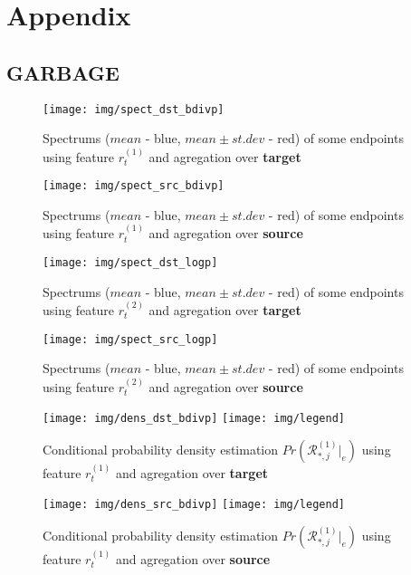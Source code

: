 \appendix
{}
\thispagestyle{empty}  
\renewcommand{\appendixname}{Appendix}%


\chapter*{Appendix}

\section*{GARBAGE}

\begin{figure}[h!]%
  \centering
  \texttt{[image: img/spect\_dst\_bdivp]}
  \caption{Spectrums ($mean$ - blue, $mean\pm st.dev$ - red) of some  endpoints using feature $r_t^{(1)}$ and agregation over \textbf{target}}
  \label{fig:spect_dst_bdivp}
\end{figure}
\begin{figure}[h!]%
  \centering
  \texttt{[image: img/spect\_src\_bdivp]}
  \caption{Spectrums ($mean$ - blue, $mean\pm st.dev$ - red) of some  endpoints using feature $r_t^{(1)}$ and agregation over \textbf{source}}
  \label{fig:spect_src_bdivp}
\end{figure}
\begin{figure}[h!]%
  \centering
  \texttt{[image: img/spect\_dst\_logp]}
  \caption{Spectrums ($mean$ - blue, $mean\pm st.dev$ - red) of some  endpoints using feature $r_t^{(2)}$ and agregation over \textbf{target}}
  \label{fig:spect_dst_logp}
\end{figure}
\begin{figure}[h!]%
  \centering
  \texttt{[image: img/spect\_src\_logp]}
  \caption{Spectrums ($mean$ - blue, $mean\pm st.dev$ - red) of some  endpoints using feature $r_t^{(2)}$ and agregation over \textbf{source}}
  \label{fig:spect_src_logp}
\end{figure}
\begin{figure}[h!]%
  \centering
  \texttt{[image: img/dens\_dst\_bdivp]}
      \texttt{[image: img/legend]}
  \caption{Conditional probability density estimation $Pr ( \mathcal{R}^{(1)}_{*,j}|_e ) $ using feature $r_t^{(1)}$ and agregation over \textbf{target}}
  \label{fig:dens_dst_bdivp}
\end{figure}
\begin{figure}[h!]%
  \centering
  \texttt{[image: img/dens\_src\_bdivp]}
    \texttt{[image: img/legend]}
  \caption{Conditional probability density estimation $Pr ( \mathcal{R}^{(1)}_{*,j}|_e ) $ using feature $r_t^{(1)}$ and agregation over \textbf{source}}
  \label{fig:dens_src_bdivp}
\end{figure}

